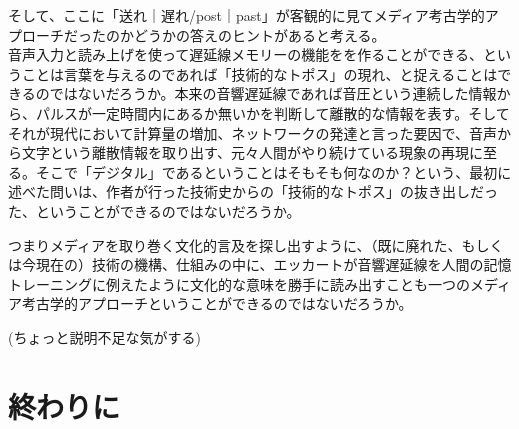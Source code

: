 そして、ここに「送れ｜遅れ/post｜past」が客観的に見てメディア考古学的アプローチだったのかどうかの答えのヒントがあると考える。\\
音声入力と読み上げを使って遅延線メモリーの機能をを作ることができる、ということは言葉を与えるのであれば「技術的なトポス」の現れ、と捉えることはできるのではないだろうか。本来の音響遅延線であれば音圧という連続した情報から、パルスが一定時間内にあるか無いかを判断して離散的な情報を表す。そしてそれが現代において計算量の増加、ネットワークの発達と言った要因で、音声から文字という離散情報を取り出す、元々人間がやり続けている現象の再現に至る。そこで「デジタル」であるということはそもそも何なのか？という、最初に述べた問いは、作者が行った技術史からの「技術的なトポス」の抜き出しだった、ということができるのではないだろうか。

つまりメディアを取り巻く文化的言及を探し出すように、（既に廃れた、もしくは今現在の）技術の機構、仕組みの中に、エッカートが音響遅延線を人間の記憶トレーニングに例えたように文化的な意味を勝手に読み出すことも一つのメディア考古学的アプローチということができるのではないだろうか。

(ちょっと説明不足な気がする)

\chapter{終わりに}\label{ux7d42ux308fux308aux306b}
